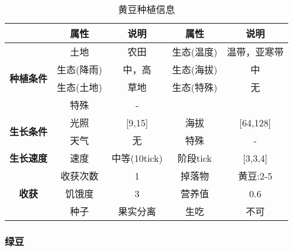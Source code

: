 \begin{table}[H]
    \centering
    \caption{黄豆种植信息}
    \label{table:黄豆种植信息}
    \setlength{\tabcolsep}{4mm}
    \begin{tabular}{c|cc|cc}
        \toprule
                                           & \textbf{属性} & \textbf{说明}   & \textbf{属性} & \textbf{说明} \\
        \midrule
        \multirow{4}{*}{\textbf{种植条件}} & 土地          & 农田            & 生态(温度)    & 温带，亚寒带    \\
                                           & 生态(降雨)    & 中，高          & 生态(海拔)    & 中            \\
                                           & 生态(土地)    & 草地            & 生态(特殊)    & 无            \\
                                           & 特殊          & -                                 \\
        \midrule
        \multirow{2}{*}{\textbf{生长条件}} & 光照          & [9,15]         & 海拔          & [64,128]      \\
                                           & 天气          & 无              & 特殊          & -      \\
        \midrule
        \textbf{生长速度}                  & 速度          & 中等(10tick)       & 阶段tick      & [3,3,4]       \\
        \midrule
        \multirow{3}{*}{\textbf{收获}}     & 收获次数      & 1               & 掉落物        & 黄豆:2-5      \\
                                           & 饥饿度        & 3               & 营养值        & 0.6           \\
                                           & 种子          & 果实分离        & 生吃          & 不可          \\
        \bottomrule
    \end{tabular}
\end{table}

\subsubsection{绿豆}

